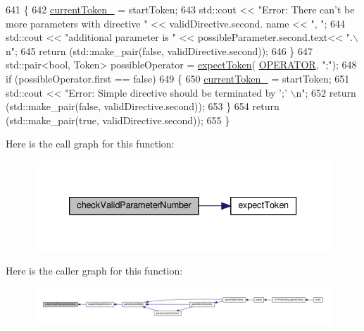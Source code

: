 \begin{DoxyCode}
641         \{
642             \hyperlink{classft_1_1_parser_a942c5b794d108f144c5b5028aaa34cb6}{currentToken\_} = startToken;
643             std::cout << \textcolor{stringliteral}{"Error: There can't be more parameters with directive "} << validDirective.second.
      name << \textcolor{stringliteral}{", "};
644             std::cout << \textcolor{stringliteral}{"additional parameter is "} << possibleParameter.second.text<< \textcolor{stringliteral}{".\(\backslash\)n"};
645             \textcolor{keywordflow}{return} (std::make\_pair(\textcolor{keyword}{false}, validDirective.second));
646         \}
647         std::pair<bool, Token> possibleOperator = \hyperlink{classft_1_1_parser_a1615a752d3642bb53598e2c8db810db0}{expectToken}(
      \hyperlink{namespaceft_aa520fbf142ba1e7e659590c07da31921a6411d9d6073252e4d316493506bbb979}{OPERATOR}, \textcolor{stringliteral}{";"});
648         \textcolor{keywordflow}{if} (possibleOperator.first == \textcolor{keyword}{false})
649         \{
650             \hyperlink{classft_1_1_parser_a942c5b794d108f144c5b5028aaa34cb6}{currentToken\_} = startToken;
651             std::cout << \textcolor{stringliteral}{"Error: Simple directive should be terminated by ';' \(\backslash\)n"};
652             \textcolor{keywordflow}{return} (std::make\_pair(\textcolor{keyword}{false}, validDirective.second));
653         \}
654         \textcolor{keywordflow}{return} (std::make\_pair(\textcolor{keyword}{true}, validDirective.second));
655     \}
\end{DoxyCode}
Here is the call graph for this function\+:
\nopagebreak
\begin{figure}[H]
\begin{center}
\leavevmode
\includegraphics[width=333pt]{classft_1_1_parser_a31501116433b0b1f8d9d58f27658ea98_cgraph}
\end{center}
\end{figure}
Here is the caller graph for this function\+:
\nopagebreak
\begin{figure}[H]
\begin{center}
\leavevmode
\includegraphics[width=350pt]{classft_1_1_parser_a31501116433b0b1f8d9d58f27658ea98_icgraph}
\end{center}
\end{figure}
\mbox{\label{classft_1_1_parser_abcf864a160e3c4e1866edceae06b921b}} 
